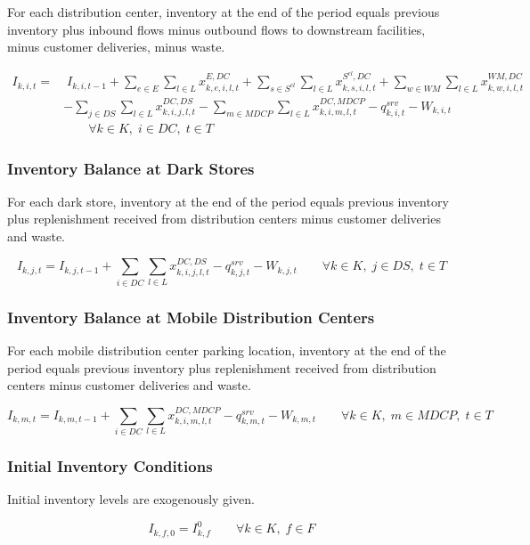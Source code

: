 \documentclass[12pt]{article}
\begin{document}
For each distribution center, inventory at the end of the period equals previous inventory plus inbound flows minus outbound flows to downstream facilities, minus customer deliveries, minus waste.

\begin{align*}
I_{k,i,t}
=
& \; I_{k,i,t-1}
+ \sum_{e \in E}\sum_{l \in L} x^{E,DC}_{k,e,i,l,t}
+ \sum_{s \in S^{cl}}\sum_{l \in L} x^{S^{cl},DC}_{k,s,i,l,t}
+ \sum_{w \in WM}\sum_{l \in L} x^{WM,DC}_{k,w,i,l,t} \\
& - \sum_{j \in DS}\sum_{l \in L} x^{DC,DS}_{k,i,j,l,t}
- \sum_{m \in MDCP}\sum_{l \in L} x^{DC,MDCP}_{k,i,m,l,t}
- q^{srv}_{k,i,t}
- W_{k,i,t}
\\
& \qquad \forall k \in K,\; i \in DC,\; t \in T
\end{align*}

\subsubsection{Inventory Balance at Dark Stores}

For each dark store, inventory at the end of the period equals previous inventory plus replenishment received from distribution centers minus customer deliveries and waste.

\[
I_{k,j,t}
=
I_{k,j,t-1}
+
\sum_{i \in DC}\sum_{l \in L} x^{DC,DS}_{k,i,j,l,t}
-
q^{srv}_{k,j,t}
-
W_{k,j,t}
\qquad
\forall k \in K,\; j \in DS,\; t \in T
\]

\subsubsection{Inventory Balance at Mobile Distribution Centers}

For each mobile distribution center parking location, inventory at the end of the period equals previous inventory plus replenishment received from distribution centers minus customer deliveries and waste.

\[
I_{k,m,t}
=
I_{k,m,t-1}
+
\sum_{i \in DC}\sum_{l \in L} x^{DC,MDCP}_{k,i,m,l,t}
-
q^{srv}_{k,m,t}
-
W_{k,m,t}
\qquad
\forall k \in K,\; m \in MDCP,\; t \in T
\]

\subsubsection{Initial Inventory Conditions}

Initial inventory levels are exogenously given.

\[
I_{k,f,0} = I^0_{k,f}
\qquad
\forall k \in K,\; f \in F
\]
\end{document}
